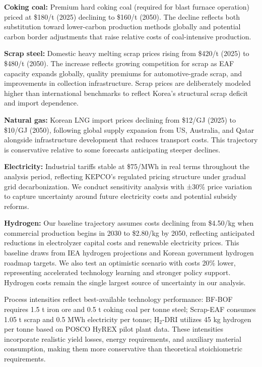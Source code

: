 \textbf{Coking coal:} Premium hard coking coal (required for blast furnace operation) priced at \$180/t (2025) declining to \$160/t (2050). The decline reflects both substitution toward lower-carbon production methods globally and potential carbon border adjustments that raise relative costs of coal-intensive production.

\textbf{Scrap steel:} Domestic heavy melting scrap prices rising from \$420/t (2025) to \$480/t (2050). The increase reflects growing competition for scrap as EAF capacity expands globally, quality premiums for automotive-grade scrap, and improvements in collection infrastructure. Scrap prices are deliberately modeled higher than international benchmarks to reflect Korea's structural scrap deficit and import dependence.

\textbf{Natural gas:} Korean LNG import prices declining from \$12/GJ (2025) to \$10/GJ (2050), following global supply expansion from US, Australia, and Qatar alongside infrastructure development that reduces transport costs. This trajectory is conservative relative to some forecasts anticipating steeper declines.

\textbf{Electricity:} Industrial tariffs stable at \$75/MWh in real terms throughout the analysis period, reflecting KEPCO's regulated pricing structure under gradual grid decarbonization. We conduct sensitivity analysis with ±30\% price variation to capture uncertainty around future electricity costs and potential subsidy reforms.

\textbf{Hydrogen:} Our baseline trajectory assumes costs declining from \$4.50/kg when commercial production begins in 2030 to \$2.80/kg by 2050, reflecting anticipated reductions in electrolyzer capital costs and renewable electricity prices. This baseline draws from IEA hydrogen projections and Korean government hydrogen roadmap targets. We also test an optimistic scenario with costs 20\% lower, representing accelerated technology learning and stronger policy support. Hydrogen costs remain the single largest source of uncertainty in our analysis.

Process intensities reflect best-available technology performance: BF-BOF requires 1.5 t iron ore and 0.5 t coking coal per tonne steel; Scrap-EAF consumes 1.05 t scrap and 0.5 MWh electricity per tonne; H$_2$-DRI utilizes 45 kg hydrogen per tonne based on POSCO HyREX pilot plant data. These intensities incorporate realistic yield losses, energy requirements, and auxiliary material consumption, making them more conservative than theoretical stoichiometric requirements.

